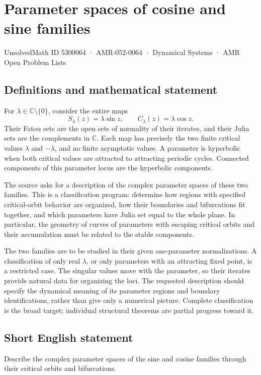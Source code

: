 \documentclass[11pt,a4paper]{article}
\begin{document}
\section*{Parameter spaces of cosine and sine families}\label{5300064}
{\small UnsolvedMath ID 5300064 · AMR-052-0064 · Dynamical Systems · AMR Open Problem Lists}
\subsection{Definitions and mathematical statement}
For $\lambda\in\mathbb C\setminus\{0\}$, consider the entire maps
\[
 S_\lambda(z)=\lambda\sin z,\qquad
 C_\lambda(z)=\lambda\cos z.
\]
Their Fatou sets are the open sets of normality of their iterates,
and their Julia sets are the complements in $\mathbb C$. Each map
has precisely the two finite critical values $\lambda$ and
$-\lambda$, and no finite asymptotic values. A parameter is
hyperbolic when both critical values are attracted to attracting
periodic cycles. Connected components of this parameter locus are
the hyperbolic components.

The source asks for a description of the complex parameter spaces
of these two families. This is a classification program: determine
how regions with specified critical-orbit behavior are organized,
how their boundaries and bifurcations fit together, and which
parameters have Julia set equal to the whole plane. In particular,
the geometry of curves of parameters with escaping critical orbits
and their accumulation must be related to the stable components.

The two families are to be studied in their given one-parameter
normalizations. A classification of only real $\lambda$, or only
parameters with an attracting fixed point, is a restricted case.
The singular values move with the parameter, so their iterates
provide natural data for organizing the loci. The requested
description should specify the dynamical meaning of its parameter
regions and boundary identifications, rather than give only a
numerical picture. Complete classification is the broad target;
individual structural theorems are partial progress toward it.
\subsection{Short English statement}
Describe the complex parameter spaces of the sine and cosine families through their critical orbits and bifurcations.
\end{document}
